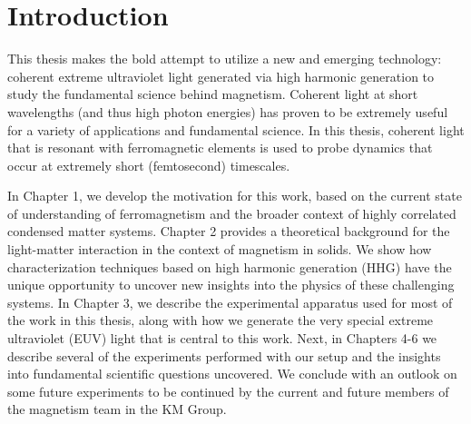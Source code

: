 \chapter{Introduction}
\label{introchap}

This thesis makes the bold attempt to utilize a new and emerging technology: coherent extreme ultraviolet light generated via high harmonic generation to study the fundamental science behind magnetism. Coherent light at short wavelengths (and thus high photon energies) has proven to be extremely useful for a variety of applications and fundamental science. In this thesis, coherent light that is resonant with ferromagnetic elements is used to probe dynamics that occur at extremely short (femtosecond) timescales.

In Chapter 1, we develop the motivation for this work, based on the current state of understanding of ferromagnetism and the broader context of highly correlated condensed matter systems. Chapter 2 provides a theoretical background for the light-matter interaction in the context of magnetism in solids. We show how characterization techniques based on high harmonic generation (HHG) have the unique opportunity to uncover new insights into the physics of these challenging systems. In Chapter 3, we describe the experimental apparatus used for most of the work in this thesis, along with how we generate the very special extreme ultraviolet (EUV) light that is central to this work. Next, in Chapters 4-6 we describe several of the experiments performed with our setup and the insights into fundamental scientific questions uncovered. We conclude with an outlook on some future experiments to be continued by the current and future members of the magnetism team in the KM Group.


